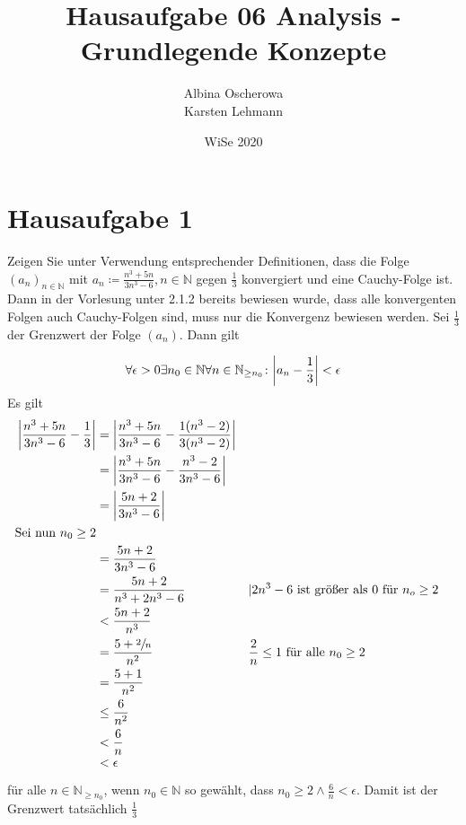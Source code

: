 \documentclass{article}
\author{Albina Oscherowa \\ Karsten Lehmann}
\date{WiSe 2020}
\title{Hausaufgabe 06 Analysis - Grundlegende Konzepte}
\begin{document}
\section*{Hausaufgabe 1}

Zeigen Sie unter Verwendung entsprechender Definitionen, dass die Folge $(a_n)_{n \in \mathbb{N}}$ mit
$a_n \coloneqq \frac{n^3 + 5n}{3n^3 - 6}, n \in \mathbb{N}$ gegen $\frac{1}{3}$ konvergiert und eine
Cauchy-Folge ist. \\

\noindent
Dann in der Vorlesung unter 2.1.2 bereits bewiesen wurde, dass alle konvergenten Folgen auch Cauchy-Folgen sind,
muss nur die Konvergenz bewiesen werden. Sei $\frac{1}{3}$ der Grenzwert der Folge $(a_n)$. Dann gilt

\[
  \forall \epsilon > 0 \exists n_0 \in \mathbb{N} \forall n \in \mathbb{N}_{\geq n_0} \colon \abs{a_n - \frac{1}{3}} < \epsilon
\]
Es gilt
\begin{align*}
  \abs{\frac{n^3 + 5n}{3n^3 - 6} - \frac{1}{3}} &= \abs{\frac{n^3 + 5n}{3n^3 - 6} - \frac{1(n^3 - 2)}{3(n^3 - 2)}} \\
                                                &= \abs{\frac{n^3 + 5n}{3n^3 - 6} - \frac{n^3 - 2}{3n^3 - 6}} \\
                                                &= \abs{\frac{5n + 2}{3n^3 - 6}} \\
  \text{Sei nun $n_0 \geq 2$} \\
                                                &= \frac{5n + 2}{3n^3 - 6} \\
                                                &= \frac{5n + 2}{n^3 + 2n^3  - 6} && | 2n^3 - 6 \text{ ist größer als 0 für } n_o \geq 2 \\
                                                &< \frac{5n + 2}{n^3} \\
                                                &= \frac{5 + \sfrac{2}{n}}{n^2} && \frac{2}{n} \leq 1 \text{ für alle } n_0 \geq 2 \\
                                                &= \frac{5 + 1}{n^2}  \\
                                                &\leq \frac{6}{n^2} \\
                                                &< \frac{6}{n} \\
                                                &< \epsilon
\end{align*}

für alle $n \in \mathbb{N}_{\geq n_0}$, wenn $n_0 \in \mathbb{N}$ so gewählt, dass $n_0 \geq 2 \land \frac{6}{n} < \epsilon$.
Damit ist der Grenzwert tatsächlich $\frac{1}{3}$\\
\end{document}
